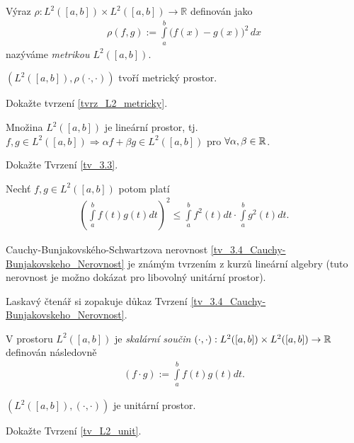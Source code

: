 \begin{definition}[Metrika $L^2$]
Výraz $\rho: L^2([a,b]) \times L^2([a,b]) \to \mathbb{R} $ definován jako
\begin{align*}
\rho (f,g) := \int \limits _a^b \Big(f(x) - g(x)\Big)^2 \, dx
\end{align*}
nazýváme \textit{metrikou $L^2([a,b])$}.
\end{definition}
\begin{tvrz}
\label{tvrz_L2_metricky}
$(L^2([a,b]), \rho(\cdot, \cdot))$ tvoří metrický prostor.
\end{tvrz}
\begin{uloha}
Dokažte tvrzení \ref{tvrz_L2_metricky}.
\end{uloha}

\begin{tvrz}
\label{tv_3.3}
Množina $L^2 ([a,b])$ je lineární prostor, tj. $f,g \in L^2([a,b]) \Rightarrow \alpha f + \beta g \in L^2([a,b])$ pro $\forall \alpha, \beta \in \mathbb{R}$.
\end{tvrz}
\begin{uloha}
Dokažte Tvrzení \ref{tv_3.3}.
\end{uloha}
\begin{tvrz}
Nechť $f,g \in L^2([a,b])$ potom platí
\label{tv_3.4_Cauchy-Bunjakovskeho_Nerovnost}
\begin{align*}
\left( \int \limits_a^b f(t) g(t) dt \right)^2 \leq \int \limits_a^b f^2(t) dt \cdot \int \limits_a^b g^2(t) dt.
\end{align*}
\end{tvrz}
\begin{poznamka}
Cauchy-Bunjakovského-Schwartzova nerovnost \ref{tv_3.4_Cauchy-Bunjakovskeho_Nerovnost} je známým tvrzením z kurz\r u lineární algebry (tuto nerovnost je možno dokázat pro libovolný unitární prostor).
\end{poznamka}
\begin{uloha}
Laskavý čtenář si zopakuje důkaz Tvrzení \ref{tv_3.4_Cauchy-Bunjakovskeho_Nerovnost}.
\end{uloha}


\begin{definition}
V prostoru $L^2([a,b])$ je \textit{skalární součin} $(\cdot, \cdot):L^2([a,b]) \times L^2([a,b]) \to \mathbb{R}$ definován následovně
\begin{align*}
(f \cdot g) := \int \limits_a^b f(t) g(t) dt.
\end{align*}
\end{definition}
\begin{tvrz}
\label{tv_L2_unit}
$(L^2([a,b]), (\cdot, \cdot))$ je unitární prostor.
\end{tvrz}
\begin{uloha}
Dokažte Tvrzení \ref{tv_L2_unit}.
\end{uloha}

